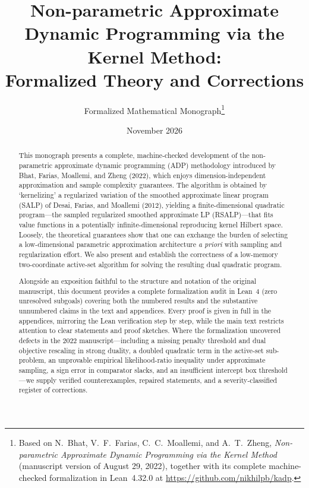 \documentclass[11pt,letterpaper]{article}
\theoremstyle{definition}
\begin{document}
\title{\bfseries Non-parametric Approximate Dynamic Programming via the Kernel Method:\\
Formalized Theory and Corrections}
\author{Formalized Mathematical Monograph\thanks{Based on N.~Bhat, V.~F.~Farias, C.~C.~Moallemi, and A.~T.~Zheng, \emph{Non-parametric Approximate Dynamic Programming via the Kernel Method} (manuscript version of August 29, 2022), together with its complete machine-checked formalization in Lean~4.32.0 at \url{https://github.com/nikhilpb/kadp}.}}
\date{November 2026}
\maketitle
\thispagestyle{plain}

\begin{abstract}
This monograph presents a complete, machine-checked development of the non-parametric approximate dynamic programming (ADP) methodology introduced by Bhat, Farias, Moallemi, and Zheng (2022), which enjoys dimension-independent approximation and sample complexity guarantees. The algorithm is obtained by `kernelizing' a regularized variation of the smoothed approximate linear program (SALP) of Desai, Farias, and Moallemi (2012), yielding a finite-dimensional quadratic program—the sampled regularized smoothed approximate LP (RSALP)—that fits value functions in a potentially infinite-dimensional reproducing kernel Hilbert space. Loosely, the theoretical guarantees show that one can exchange the burden of selecting a low-dimensional parametric approximation architecture \emph{a priori} with sampling and regularization effort. We also present and establish the correctness of a low-memory two-coordinate active-set algorithm for solving the resulting dual quadratic program.

Alongside an exposition faithful to the structure and notation of the original manuscript, this document provides a complete formalization audit in Lean~4 (zero unresolved subgoals) covering both the numbered results and the substantive unnumbered claims in the text and appendices. Every proof is given in full in the appendices, mirroring the Lean verification step by step, while the main text restricts attention to clear statements and proof sketches. Where the formalization uncovered defects in the 2022 manuscript—including a missing penalty threshold and dual objective rescaling in strong duality, a doubled quadratic term in the active-set sub-problem, an unprovable empirical likelihood-ratio inequality under approximate sampling, a sign error in comparator slacks, and an insufficient intercept box threshold—we supply verified counterexamples, repaired statements, and a severity-classified register of corrections.
\end{abstract}
\end{document}
